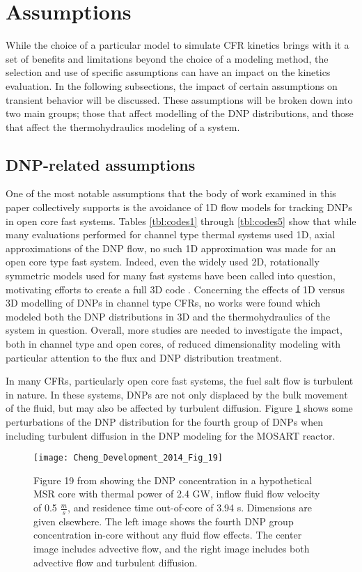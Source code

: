 \documentclass[review]{elsarticle}
\begin{document}
\section{Assumptions} \label{sec:asm}
While the choice of a particular model to simulate CFR kinetics brings
with it a set of benefits and limitations beyond the choice of a modeling
method, the selection and use of specific assumptions can have an
impact on the kinetics evaluation. In the following subsections, the
impact of certain assumptions on transient behavior will be discussed. These
assumptions will be broken down into two main groups; those that affect 
modelling of the DNP distributions, and those that affect the thermohydraulics
modeling of a system.

\subsection{DNP-related assumptions} \label{ssec:dnp_asm}
One of the most notable assumptions
that the body of work examined in this paper collectively supports is the
avoidance of 1D flow models for tracking DNPs in open core fast systems.
Tables \ref{tbl:codes1} through \ref{tbl:codes5}
 show that while many evaluations performed
for channel type thermal systems used 1D, axial approximations of the DNP
flow, no such 1D approximation was made for an open core type fast system.
Indeed, even the widely used 2D, rotationally symmetric models used for many
fast systems have been called into question, 
motivating efforts
to create a full 3D code \cite{aufiero_development_2014}. Concerning the effects of 1D versus 3D modelling
of DNPs in channel type CFRs, no works were found
which modeled both the DNP distributions in 3D and the thermohydraulics of
the system in question. Overall, more studies are needed to investigate the
impact, both in channel type and open cores, of reduced dimensionality
modeling with particular attention to the flux and DNP distribution treatment.
\par In many CFRs, particularly open core fast systems, the fuel salt flow is
turbulent in nature. In these systems, DNPs are not only displaced by the
bulk movement of the fluid, but may also be affected by turbulent diffusion.
Figure \ref{fig:cheng_diffusion} shows some perturbations of the DNP
distribution for the fourth group of DNPs when including turbulent diffusion
in the DNP modeling for the MOSART reactor.

\begin{figure}[H]
   \centering
   \texttt{[image: Cheng\_Development\_2014\_Fig\_19]}
   \caption{Figure 19 from \cite{cheng_development_2014} showing the DNP
   concentration in a
   hypothetical MSR core with thermal power of 2.4 GW, inflow fluid flow
   velocity of 0.5
   $\frac{m}{s}$, and residence time out-of-core of 3.94 s. Dimensions are 
   given elsewhere. \cite{cheng_development_2014}
   The left image shows the fourth
   DNP group concentration in-core without any fluid flow effects. The center
   image
   includes advective flow, and the right image includes both advective flow and
   turbulent diffusion.} 
   \label{fig:cheng_diffusion}
\end{figure}
\end{document}
